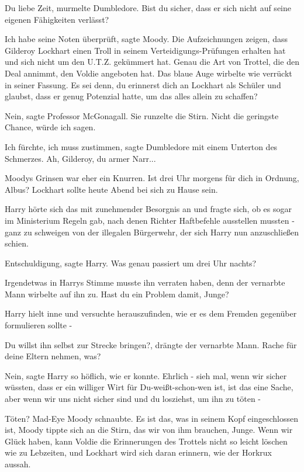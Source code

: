 \glqq{}Du liebe Zeit\grqq{}, murmelte Dumbledore. \glqq{}Bist du sicher, dass er
sich nicht auf seine eigenen Fähigkeiten verlässt?\grqq{}

\glqq{}Ich habe seine Noten überprüft\grqq{}, sagte Moody. \glqq{}Die
Aufzeichnungen zeigen, dass Gilderoy Lockhart einen Troll in seinem
Verteidigungs-Prüfungen erhalten hat und sich nicht um den U.T.Z. gekümmert hat.
Genau die Art von Trottel, die den Deal annimmt, den Voldie angeboten
hat.\grqq{} Das blaue Auge wirbelte wie verrückt in seiner Fassung. \glqq{}Es sei
denn, du erinnerst dich an Lockhart als Schüler und glaubst, dass er genug
Potenzial hatte, um das alles allein zu schaffen?\grqq{}

\glqq{}Nein\grqq{}, sagte Professor McGonagall. Sie runzelte die Stirn. \glqq{}
Nicht die geringste Chance, würde ich sagen.\grqq{}

\glqq{}Ich fürchte, ich muss zustimmen\grqq{}, sagte Dumbledore mit einem
Unterton des Schmerzes. \glqq{}Ah, Gilderoy, du armer Narr...\grqq{}

Moodys Grinsen war eher ein Knurren. \glqq{}Ist drei Uhr morgens für dich in
Ordnung, Albus? Lockhart sollte heute Abend bei sich zu Hause sein.\grqq{}

Harry hörte sich das mit zunehmender Besorgnis an und fragte sich, ob es sogar
im Ministerium Regeln gab, nach denen Richter Haftbefehle ausstellen mussten -
ganz zu schweigen von der illegalen Bürgerwehr, der sich Harry nun anzuschließen
schien.

\glqq{}Entschuldigung\grqq{}, sagte Harry. \glqq{}Was genau passiert um drei Uhr
nachts?\grqq{}

Irgendetwas in Harrys Stimme musste ihn verraten haben, denn der vernarbte Mann
wirbelte auf ihn zu. \glqq{}Hast du ein Problem damit, Junge?\grqq{}

Harry hielt inne und versuchte herauszufinden, wie er es dem Fremden gegenüber
formulieren sollte -

\glqq{}Du willst ihn selbst zur Strecke bringen?\grqq{}, drängte der vernarbte
Mann. \glqq{}Rache für deine Eltern nehmen, was?\grqq{}

\glqq{}Nein\grqq{}, sagte Harry so höflich, wie er konnte. \glqq{}Ehrlich - sieh
mal, wenn wir sicher wüssten, dass er ein williger Wirt für Du-weißt-schon-wen
ist, ist das eine Sache, aber wenn wir uns nicht sicher sind und du losziehst,
um ihn zu töten -\grqq{}

\glqq{}Töten?\grqq{} Mad-Eye Moody schnaubte. \glqq{}Es ist das, was in seinem
Kopf eingeschlossen ist\grqq{}, Moody tippte sich an die Stirn, \glqq{}das wir
von ihm brauchen, Junge. Wenn wir Glück haben, kann Voldie die Erinnerungen des
Trottels nicht so leicht löschen wie zu Lebzeiten, und Lockhart wird sich daran
erinnern, wie der Horkrux aussah.\grqq{}

